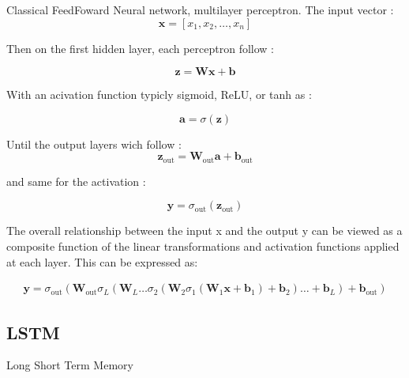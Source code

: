 \documentclass[letterpaper,11pt]{article}
\begin{document}
Classical FeedFoward Neural network, multilayer perceptron.
The input vector :
\[
\mathbf{x} = [x_1, x_2, \ldots, x_n]
\]

Then on the first hidden layer, each perceptron follow :

\[
\mathbf{z} = \mathbf{W}\mathbf{x} + \mathbf{b}
\]

With an acivation function typicly sigmoid, ReLU, or tanh as :

\[
\mathbf{a} = \sigma(\mathbf{z})
\]


Until the output layers wich follow : 
\[
\mathbf{z}_{\text{out}} = \mathbf{W}_{\text{out}}\mathbf{a} + \mathbf{b}_{\text{out}}
\]

and same for the activation :

\[
\mathbf{y} = \sigma_{\text{out}}(\mathbf{z}_{\text{out}})
\]

The overall relationship between the input x and the output y can be viewed as a composite function of the linear transformations and activation functions applied at each layer. This can be expressed as:

\begin{align}
\mathbf{y} = \sigma_{\text{out}}(\mathbf{W}_{\text{out}} \sigma_L(\mathbf{W}_L \ldots \sigma_2(\mathbf{W}_2 \sigma_1(\mathbf{W}_1 \mathbf{x} + \mathbf{b}_1) + \mathbf{b}_2) \ldots + \mathbf{b}_L) + \mathbf{b}_{\text{out}})
\end{align}


\newpage
\begin{center}
    \subsection*{LSTM}
    Long Short Term Memory
\end{center}
\end{document}
